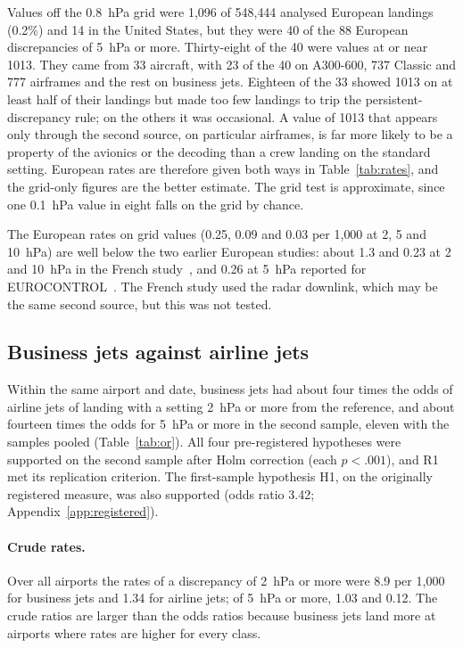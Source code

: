 \documentclass[11pt]{article}
\begin{document}
Values off the 0.8~hPa grid were 1{,}096 of 548{,}444 analysed European landings (0.2\%) and 14 in the United States, but they were 40 of the 88 European discrepancies of 5~hPa or more. Thirty-eight of the 40 were values at or near 1013. They came from 33 aircraft, with 23 of the 40 on A300-600, 737 Classic and 777 airframes and the rest on business jets. Eighteen of the 33 showed 1013 on at least half of their landings but made too few landings to trip the persistent-discrepancy rule; on the others it was occasional. A value of 1013 that appears only through the second source, on particular airframes, is far more likely to be a property of the avionics or the decoding than a crew landing on the standard setting. European rates are therefore given both ways in Table~\ref{tab:rates}, and the grid-only figures are the better estimate. The grid test is approximate, since one 0.1~hPa value in eight falls on the grid by chance.

The European rates on grid values (0.25, 0.09 and 0.03 per 1{,}000 at 2, 5 and 10~hPa) are well below the two earlier European studies: about 1.3 and 0.23 at 2 and 10~hPa in the French study~\cite{dsac2025}, and 0.26 at 5~hPa reported for EUROCONTROL~\cite{grepecas2026}. The French study used the radar downlink, which may be the same second source, but this was not tested.

\subsection{Business jets against airline jets}

Within the same airport and date, business jets had about four times the odds of airline jets of landing with a setting 2~hPa or more from the reference, and about fourteen times the odds for 5~hPa or more in the second sample, eleven with the samples pooled (Table~\ref{tab:or}). All four pre-registered hypotheses were supported on the second sample after Holm correction (each $p < .001$), and R1 met its replication criterion. The first-sample hypothesis H1, on the originally registered measure, was also supported (odds ratio 3.42; Appendix~\ref{app:registered}).



\paragraph{Crude rates.} Over all airports the rates of a discrepancy of 2~hPa or more were 8.9 per 1{,}000 for business jets and 1.34 for airline jets; of 5~hPa or more, 1.03 and 0.12. The crude ratios are larger than the odds ratios because business jets land more at airports where rates are higher for every class.
\end{document}
